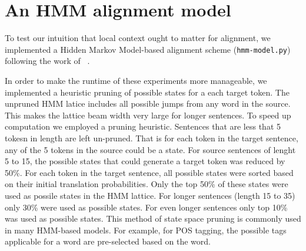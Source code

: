 \documentclass{article}
\begin{document}
\begin{comment}
    \begin{table}[h]
\begin{center}
\begin{tabular}{l|ll}
    & \multicolumn{2}{c} {AER}\\
    initialization & Model 1 & Model 2\\ \hline
    uniform & & \\
    edit distance & &
\end{tabular}
\end{center}
\caption{Using a function of Levenshtein edit distance to seed Model 1 and Model 2 improves AER over the baseline uniform initialization.}
\label{tbl:ed_dist}
\end{table}
\end{comment}

\section{An HMM alignment model}

To test our intuition that local context ought to matter for alignment, we implemented a Hidden Markov Model-based alignment scheme ({\tt hmm-model.py})
following the work of 
~\cite{Vogel96hmm-basedword}.


In order to make the runtime of these experiments more manageable, we implemented a heuristic pruning of possible states for a each target token. The unpruned HMM latice includes all possible jumps from any word in the source. This makes the lattice beam width very large for longer sentences. To speed up computation we employed a pruning heuristic. Sentences that are less that 5 tokesn in length are left un-pruned. That is for each token in the target sentence, any of the 5 tokens in the source could be a state. For source sentences of lenght 5 to 15, the possible states that could generate a target token was reduced by 50\%. For each token in the target sentence, all possible states were sorted based on their initial translation probabilities. Only the top 50\% of these states were used as possile states in the HMM lattice. For longer sentences (length 15 to 35) only 30\% were used as possible states. For even longer sentences only top 10\% was used as possible states. This method of state space pruning is commonly used in many HMM-based models. For example, for POS tagging, the possible tags applicable for a word are pre-selected based on the word. 
\end{document}
